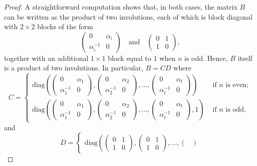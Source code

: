 \documentclass{amsart}
\theoremstyle{definition}
\begin{document}
\begin{proof}
	A straightforward computation shows that, in both cases, the matrix $B$ can be written as the
	product of two involutions, each of which is block diagonal with $2\times2$ blocks of the form
	\[
	\begin{pmatrix}
		0 & \alpha_i\\
		\alpha_i^{-1} & 0
	\end{pmatrix}
	\quad \text{and} \quad
	\begin{pmatrix}
		0 & 1\\
		1 & 0
	\end{pmatrix},
	\]
	together with an additional $1\times1$ block equal to $1$ when $n$ is odd.
	Hence, $B$ itself is a product of two involutions. In particular, $B=CD$ where  $$C=\begin{cases} \mathrm{diag}\left(\begin{pmatrix}
			0 & \alpha_1\\
			\alpha_1^{-1} & 0
		\end{pmatrix},\begin{pmatrix}
		0 & \alpha_2\\
		\alpha_2^{-1} & 0
		\end{pmatrix},\ldots,\begin{pmatrix}
		0 & \alpha_t\\
		\alpha_t^{-1} & 0
		\end{pmatrix}\right) & \text{ if $n$ is even};\\ \mathrm{diag}\left(\begin{pmatrix}
			0 & \alpha_1\\
			\alpha_1^{-1} & 0
		\end{pmatrix},\begin{pmatrix}
			0 & \alpha_2\\
			\alpha_2^{-1} & 0
		\end{pmatrix},\ldots,\begin{pmatrix}
			0 & \alpha_t\\
			\alpha_t^{-1} & 0
		\end{pmatrix},1\right) & \text{ if $n$ is odd}, \end{cases}$$ and $$D=\begin{cases} \mathrm{diag}\left(\begin{pmatrix}
		0 & 1\\
		1 & 0
		\end{pmatrix},\begin{pmatrix}
		0 & 1\\
		1 & 0
		\end{pmatrix},\ldots,\begin{pmatrix}

\end{pmatrix}
\end{cases}$$
\end{proof}
\end{document}
